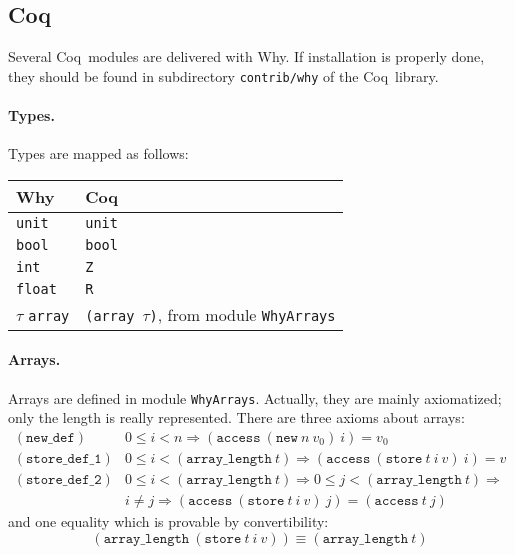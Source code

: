 \documentclass[a4paper,12pt]{report}
\makeatletter
\newcommand{\coq}{\textsf{Coq}\index{Coq@\textsf{Coq}}}
\newcommand{\why}{\textsf{Why}}
\newcommand{\te}[1]{\texttt{#1}}
\makeatother
\begin{document}
\subsection{Coq}
\label{lib:coq}

Several \coq\ modules are delivered with \why. If installation is
properly done, they should be found in subdirectory
\texttt{contrib/why} of the \coq\ library.

\paragraph{Types.} 
Types are mapped as follows:
\begin{center}
  \begin{tabular}{|l|l|}
    \hline
    \why & \coq \\
    \hline
    \texttt{unit} & \texttt{unit} \\
    \hline
    \texttt{bool} & \texttt{bool} \\
    \hline
    \texttt{int} & \texttt{Z} \\
    \hline
    \texttt{float} & \texttt{R} \\
    \hline
    $\tau$ \texttt{array} & \texttt{(array $\tau$)},
                            from module \texttt{WhyArrays} \\
    \hline
  \end{tabular}
\end{center}

\paragraph{Arrays.} 
Arrays are defined in module \texttt{WhyArrays}. Actually, they are
mainly axiomatized; only the length is really represented.
There are three axioms about arrays:
\begin{displaymath}
  \begin{array}{rl}
    (\te{new\_def}) &
    0 \le i < n \Rightarrow (\te{access} ~ (\te{new} ~ n ~ v_0) ~ i) = v_0 
    \\[1em]
    (\te{store\_def\_1}) &
    0 \le i < (\te{array\_length} ~ t) \Rightarrow
                    (\te{access} ~ (\te{store} ~ t ~ i ~ v) ~ i) = v
    \\[1em]
    (\te{store\_def\_2}) &
    0 \le i < (\te{array\_length} ~ t) \Rightarrow
    0 \le j < (\te{array\_length} ~ t) \Rightarrow \\ &
                    i \not= j \Rightarrow
                    (\te{access} ~ (\te{store} ~ t ~ i ~ v) ~ j) =
                    (\te{access} ~ t ~ j)
  \end{array}
\end{displaymath}
and one equality which is provable by convertibility:
\begin{displaymath}
  (\te{array\_length} ~ (\te{store} ~ t ~ i ~ v)) \equiv
  (\te{array\_length} ~ t)
\end{displaymath}
\end{document}
